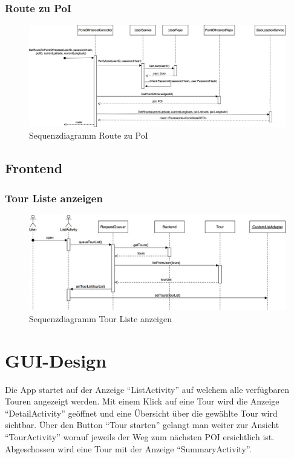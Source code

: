 \documentclass[a4paper,10pt,xetex]{article}
\begin{document}
\subsubsection{Route zu PoI}
\begin{figure}
  \includegraphics{Sequenzdiagramm_GetRouteToPoi}
  \caption{Sequenzdiagramm Route zu PoI}
\end{figure}

\subsection{Frontend}\label{frontend}
\subsubsection{Tour Liste anzeigen}
\begin{figure}
  \includegraphics{Sequenzdiagramm_getTours}
  \caption{Sequenzdiagramm Tour Liste anzeigen}
\end{figure}

\section{GUI-Design}\label{gui-design}
Die App startet auf der Anzeige ``ListActivity'' auf welchem alle verfügbaren Touren angezeigt
werden. Mit einem Klick auf eine Tour wird die Anzeige ``DetailActivity'' geöffnet und eine
Übersicht über die gewählte Tour wird sichtbar. Über den Button ``Tour starten'' gelangt
man weiter zur Ansicht ``TourActivity'' worauf jeweils der Weg zum nächsten POI ersichtlich ist.
Abgeschossen wird eine Tour mit der Anzeige ``SummaryActivity''.
\end{document}
